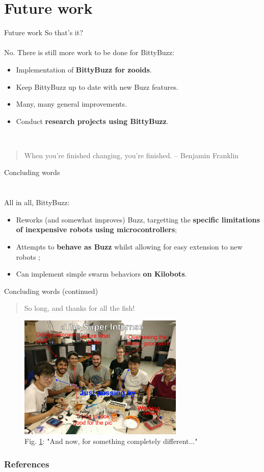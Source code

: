 \documentclass{beamer}
\begin{document}
	\section{Future work}
	\begin{frame}{Future work}
		So that's it?\\
		~\\
		No. There is still more work to be done for BittyBuzz:
		\begin{itemize}
			\item Implementation of \textbf{BittyBuzz for zooids}.
			\item Keep BittyBuzz up to date with new Buzz features.
			\item Many, many general improvements.
			\item Conduct \textbf{research projects using BittyBuzz}.
		\end{itemize}
		~\\
		\begin{quote}
			When you're finished changing, you're finished. -- Benjamin Franklin
		\end{quote}
	\end{frame}
	\begin{frame}{Concluding words}
		\section{}
		All in all, BittyBuzz:
		\begin{itemize}
			\item Reworks (and somewhat improves) Buzz, targetting the \textbf{specific limitations of inexpensive robots using microcontrollers};
			\item Attempts to \textbf{behave as Buzz} whilst allowing for easy extension to new robots ;
			\item Can implement simple swarm behaviors \textbf{on Kilobots}.
		\end{itemize}
	\end{frame}
	\begin{frame}{Concluding words (continued)}
		\begin{quote}
			So long, and thanks for all the fish!
		\end{quote}
		\begin{figure}
			\includegraphics[width=0.7\textwidth]{the_great_interns}
			\caption{\label{figure:The Great Interns}Fig. \ref{figure:The Great Interns}: "And now, for something completely different..."}
		\end{figure}
	\end{frame}
	\begin{frame}[allowframebreaks]
		\frametitle{References}
		
		
	\end{frame}
\end{document}
